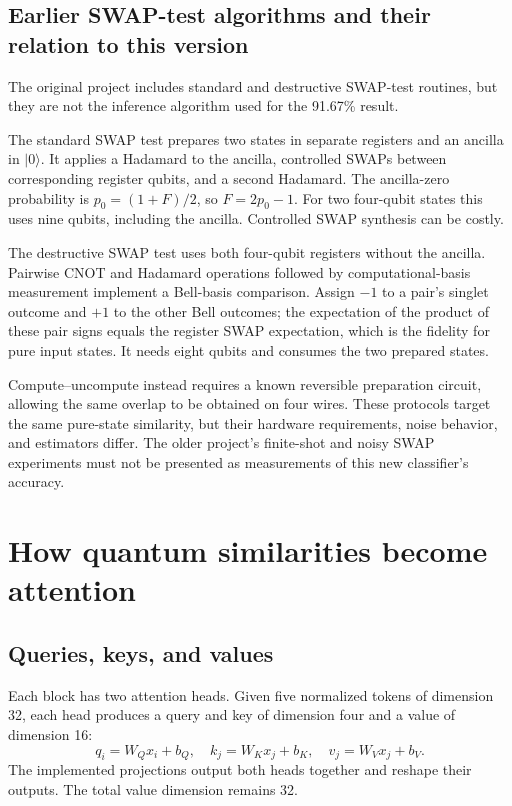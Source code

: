 \documentclass[11pt,a4paper]{report}
\newcommand{\ket}[1]{\lvert #1\rangle}
\begin{document}
\section{Earlier SWAP-test algorithms and their relation to this version}
The original project includes standard and destructive SWAP-test routines, but they are not the inference algorithm used for the 91.67\% result.

The standard SWAP test prepares two states in separate registers and an ancilla in $\ket0$. It applies a Hadamard to the ancilla, controlled SWAPs between corresponding register qubits, and a second Hadamard. The ancilla-zero probability is $p_0=(1+F)/2$, so $F=2p_0-1$. For two four-qubit states this uses nine qubits, including the ancilla. Controlled SWAP synthesis can be costly.

The destructive SWAP test uses both four-qubit registers without the ancilla. Pairwise CNOT and Hadamard operations followed by computational-basis measurement implement a Bell-basis comparison. Assign $-1$ to a pair's singlet outcome and $+1$ to the other Bell outcomes; the expectation of the product of these pair signs equals the register SWAP expectation, which is the fidelity for pure input states. It needs eight qubits and consumes the two prepared states.

Compute--uncompute instead requires a known reversible preparation circuit, allowing the same overlap to be obtained on four wires. These protocols target the same pure-state similarity, but their hardware requirements, noise behavior, and estimators differ. The older project's finite-shot and noisy SWAP experiments must not be presented as measurements of this new classifier's accuracy.

\chapter{How quantum similarities become attention}
\section{Queries, keys, and values}
Each block has two attention heads. Given five normalized tokens of dimension 32, each head produces a query and key of dimension four and a value of dimension 16:
\begin{equation}
q_i=W_Qx_i+b_Q,\quad k_j=W_Kx_j+b_K,\quad v_j=W_Vx_j+b_V.
\end{equation}
The implemented projections output both heads together and reshape their outputs. The total value dimension remains 32.
\end{document}
